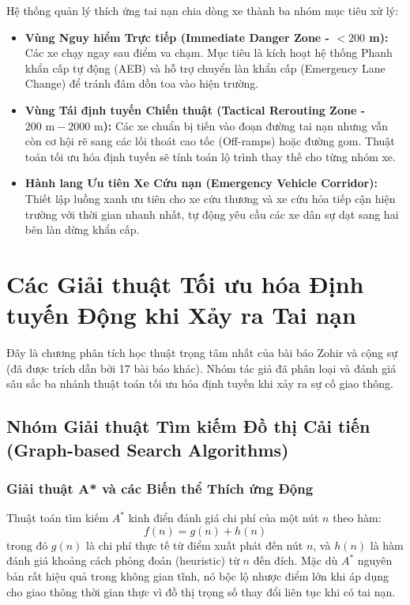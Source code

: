 \documentclass[a4paper]{article}
\begin{document}
Hệ thống quản lý thích ứng tai nạn chia dòng xe thành ba nhóm mục tiêu xử lý:
\begin{itemize}
    \item \textbf{Vùng Nguy hiểm Trực tiếp (Immediate Danger Zone - $< 200$ m):} Các xe chạy ngay sau điểm va chạm. Mục tiêu là kích hoạt hệ thống Phanh khẩn cấp tự động (AEB) và hỗ trợ chuyển làn khẩn cấp (Emergency Lane Change) để tránh đâm dồn toa vào hiện trường.
    \item \textbf{Vùng Tái định tuyến Chiến thuật (Tactical Rerouting Zone - $200 \text{ m} - 2000 \text{ m}$):} Các xe chuẩn bị tiến vào đoạn đường tai nạn nhưng vẫn còn cơ hội rẽ sang các lối thoát cao tốc (Off-ramps) hoặc đường gom. Thuật toán tối ưu hóa định tuyến sẽ tính toán lộ trình thay thế cho từng nhóm xe.
    \item \textbf{Hành lang Ưu tiên Xe Cứu nạn (Emergency Vehicle Corridor):} Thiết lập luồng xanh ưu tiên cho xe cứu thương và xe cứu hỏa tiếp cận hiện trường với thời gian nhanh nhất, tự động yêu cầu các xe dân sự dạt sang hai bên làn dừng khẩn cấp.
\end{itemize}

\clearpage

\section{Các Giải thuật Tối ưu hóa Định tuyến Động khi Xảy ra Tai nạn}

Đây là chương phân tích học thuật trọng tâm nhất của bài báo Zohir và cộng sự \cite{zohir2025nature} (đã được trích dẫn bởi 17 bài báo khác). Nhóm tác giả đã phân loại và đánh giá sâu sắc ba nhánh thuật toán tối ưu hóa định tuyến khi xảy ra sự cố giao thông.

\subsection{Nhóm Giải thuật Tìm kiếm Đồ thị Cải tiến (Graph-based Search Algorithms)}

\subsubsection{Giải thuật A* và các Biến thể Thích ứng Động}
Thuật toán tìm kiếm $A^*$ kinh điển đánh giá chi phí của một nút $n$ theo hàm:
\begin{equation}
    f(n) = g(n) + h(n)
\end{equation}
trong đó $g(n)$ là chi phí thực tế từ điểm xuất phát đến nút $n$, và $h(n)$ là hàm đánh giá khoảng cách phỏng đoán (heuristic) từ $n$ đến đích. Mặc dù $A^*$ nguyên bản rất hiệu quả trong không gian tĩnh, nó bộc lộ nhược điểm lớn khi áp dụng cho giao thông thời gian thực vì đồ thị trọng số thay đổi liên tục khi có tai nạn.
\end{document}
